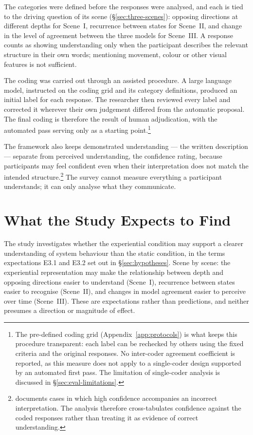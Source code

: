 The categories were defined before the responses were analysed, and each is tied to the driving question of its scene (\S\ref{sec:three-scenes}): opposing directions at different depths for Scene~I, recurrence between states for Scene~II, and change in the level of agreement between the three models for Scene~III. A response counts as showing understanding only when the participant describes the relevant structure in their own words; mentioning movement, colour or other visual features is not sufficient.

The coding was carried out through an assisted procedure. A large language model, instructed on the coding grid and its category definitions, produced an initial label for each response. The researcher then reviewed every label and corrected it wherever their own judgement differed from the automatic proposal. The final coding is therefore the result of human adjudication, with the automated pass serving only as a starting point.\footnote{The pre-defined coding grid (Appendix~\ref{app:protocols}) is what keeps this procedure transparent: each label can be rechecked by others using the fixed criteria and the original responses. No inter-coder agreement coefficient is reported, as this measure does not apply to a single-coder design supported by an automated first pass. The limitation of single-coder analysis is discussed in \S\ref{sec:eval-limitations}.}

The framework also keeps demonstrated understanding --- the written description --- separate from perceived understanding, the confidence rating, because participants may feel confident even when their interpretation does not match the intended structure.\footnote{\textcite{fischer2020} documents cases in which high confidence accompanies an incorrect interpretation. The analysis therefore cross-tabulates confidence against the coded responses rather than treating it as evidence of correct understanding.} The survey cannot measure everything a participant understands; it can only analyse what they communicate.

\section{What the Study Expects to Find}
\label{sec:eval-expectations}

The study investigates whether the experiential condition may support a clearer understanding of system behaviour than the static condition, in the terms expectations E3.1 and E3.2 set out in \S\ref{sec:hypotheses}. Scene by scene: the experiential representation may make the relationship between depth and opposing directions easier to understand (Scene~I), recurrence between states easier to recognise (Scene~II), and changes in model agreement easier to perceive over time (Scene~III). These are expectations rather than predictions, and neither presumes a direction or magnitude of effect.

